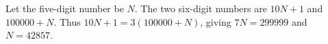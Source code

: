 Let the five-digit number be $N$. The two six-digit numbers are $10N+1$ and $100000+N$. Thus $10N+1=3(100000+N)$, giving $7N=299999$ and $\boxed{N=42857}$.
